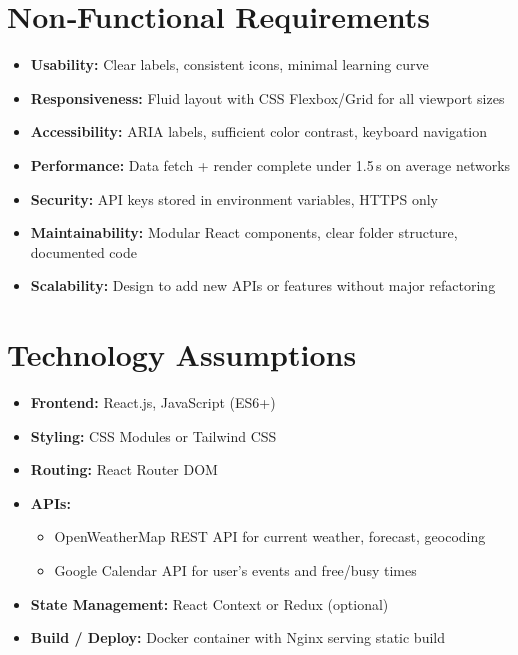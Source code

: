 \documentclass[11pt,a4paper]{article}
\begin{document}
\section{Non‑Functional Requirements}
\begin{itemize}[nosep]
  \item \textbf{Usability:} Clear labels, consistent icons, minimal learning curve
  \item \textbf{Responsiveness:} Fluid layout with CSS Flexbox/Grid for all viewport sizes
  \item \textbf{Accessibility:} ARIA labels, sufficient color contrast, keyboard navigation
  \item \textbf{Performance:} Data fetch + render complete under 1.5 s on average networks
  \item \textbf{Security:} API keys stored in environment variables, HTTPS only
  \item \textbf{Maintainability:} Modular React components, clear folder structure, documented code
  \item \textbf{Scalability:} Design to add new APIs or features without major refactoring
\end{itemize}

\section{Technology Assumptions}
\begin{itemize}[nosep]
  \item \textbf{Frontend:} React.js, JavaScript (ES6+)
  \item \textbf{Styling:} CSS Modules or Tailwind CSS
  \item \textbf{Routing:} React Router DOM
  \item \textbf{APIs:} 
    \begin{itemize}[nosep]
      \item OpenWeatherMap REST API for current weather, forecast, geocoding 
      \item Google Calendar API for user’s events and free/busy times
    \end{itemize}
  \item \textbf{State Management:} React Context or Redux (optional)
  \item \textbf{Build / Deploy:} Docker container with Nginx serving static build
\end{itemize}
\end{document}
